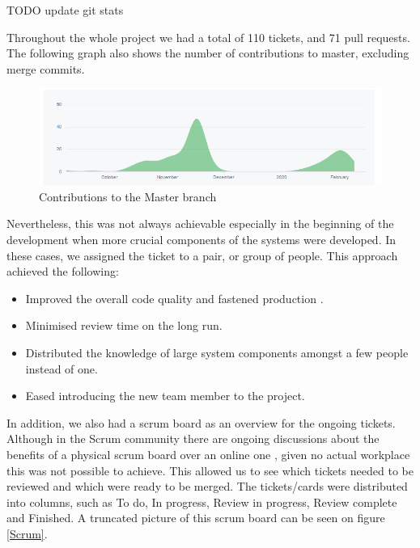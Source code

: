 \documentclass[main.tex]{subfiles}
\begin{document}
TODO update git stats

Throughout the whole project we had a total of 110 tickets, and 71 pull requests. The following graph also shows the number of contributions to master, excluding merge commits.

\begin{figure}[H]
   \centering
   \includegraphics[scale=0.8]{05Coding/05Pictures/contributions.png}
   \caption{Contributions to the Master branch}
\end{figure}

Nevertheless, this was not always achievable especially in the beginning of the development when more crucial components of the systems were developed. In these cases, we assigned the ticket to a pair, or group of people. This approach achieved the following:

\begin{itemize}
    \item Improved the overall code quality and fastened production \cite{pairprogramming}.
    \item Minimised review time on the long run.
    \item Distributed the knowledge of large system components amongst a few people instead of one.
    \item Eased introducing the new team member to the project.
\end{itemize}

In addition, we also had a scrum board as an overview for the ongoing tickets. Although in the Scrum community there are ongoing discussions about the benefits of a physical scrum board over an online one \cite{physicalscrum}, given no actual workplace this was not possible to achieve. This allowed us to see which tickets needed to be reviewed and which were ready to be merged. The tickets/cards were distributed into columns, such as To do, In progress, Review in progress, Review complete and Finished. A truncated picture of this scrum board can be seen on figure \figurename{\ref{Scrum}}.
\end{document}
